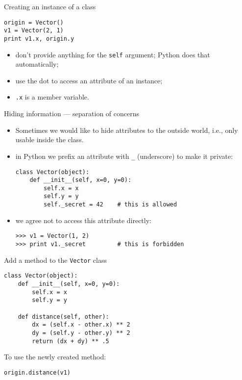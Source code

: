\documentclass{beamer}
\begin{document}
\begin{frame}[fragile]{Creating an instance of a class}
\begin{verbatim}
origin = Vector()
v1 = Vector(2, 1)
print v1.x, origin.y
\end{verbatim}

\bigskip

\begin{itemize}
\item don't provide anything for the \texttt{self} argument;
Python does that automatically;
\item use the \textcolor{pms280_compl}{dot} to access an attribute of an
instance;
\item \texttt{.x} is a member variable.
\end{itemize}
\end{frame}

\begin{frame}[fragile]{Hiding information --- separation of concerns}
\begin{itemize}
\item Sometimes we would like to \textcolor{pms280_compl}{hide}
attributes to the outside world, i.e., only usable inside the class.

\item in Python we prefix an attribute with \texttt{_}
(underscore) to make it \textcolor{pms280_compl}{private}:
\begin{verbatim}
class Vector(object):
    def __init__(self, x=0, y=0):
        self.x = x
        self.y = y
        self._secret = 42    # this is allowed
\end{verbatim}

\item we agree not to access this attribute directly:
\begin{verbatim}
>>> v1 = Vector(1, 2)
>>> print v1._secret         # this is forbidden
\end{verbatim}

\end{itemize}
\end{frame}

\begin{frame}[fragile]{Add a method to the \texttt{Vector} class}
\begin{verbatim}
class Vector(object):
    def __init__(self, x=0, y=0):
        self.x = x
        self.y = y

    def distance(self, other):
        dx = (self.x - other.x) ** 2
        dy = (self.y - other.y) ** 2
        return (dx + dy) ** .5
\end{verbatim}

\bigskip

To use the newly created method:
\begin{verbatim}
origin.distance(v1)
\end{verbatim}
\end{frame}
\end{document}
